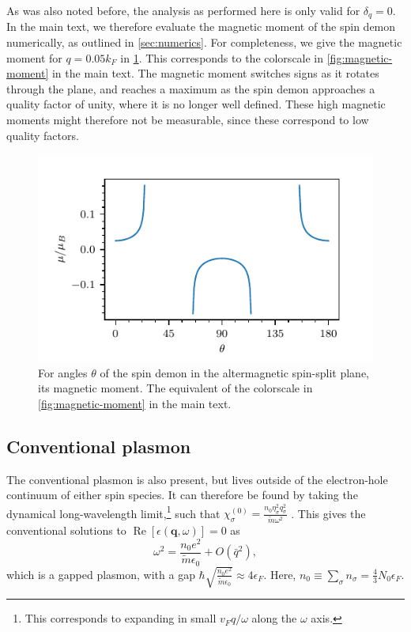 \documentclass[aps,prb,reprint,twocolumns,superscriptaddress,nofootinbib]{revtex4-2}
\DeclareMathOperator{\Ree}{Re}
\newcommand{\mdos}{\tilde{m}}
\newcommand{\kF}{k_{F}}
\begin{document}
	As was also noted before, the analysis as performed here is only valid for $\delta_q=0$.
	In the main text, we therefore evaluate the magnetic moment of the spin demon numerically, as outlined in \cref{sec:numerics}. For completeness, we give the magnetic moment for $q=0.05\kF$ in \cref{fig:magnetic-moment-SM}. This corresponds to the colorscale in \cref{fig:magnetic-moment} in the main text. The magnetic moment switches signs as it rotates through the plane, and reaches a maximum as the spin demon approaches a quality factor of unity, where it is no longer well defined. These high magnetic moments might therefore not be measurable, since these correspond to low quality factors. 
	
	\begin{figure}
		\includegraphics{non-polar-plot-sign}
		\caption{For angles $\theta$ of the spin demon in the altermagnetic spin-split plane, its magnetic moment. The equivalent of the colorscale in \cref{fig:magnetic-moment} in the main text. \label{fig:magnetic-moment-SM}}
	\end{figure}
	
	
	\subsection{Conventional plasmon}
	The conventional plasmon is also present, but lives outside of the electron-hole continuum of either spin species. It can therefore be found by taking the dynamical long-wavelength limit,\footnote{This corresponds to expanding in small $v_Fq/\omega$ along the $\omega$ axis. } such that $\chi_{\sigma}^{(0)}=\frac{n_0 \eta_\sigma^2 q_\sigma^2}{\mdos \omega^2}$ \cite{giulianiQuantumTheoryElectron2005}. This gives the conventional solutions to $\Ree[\epsilon(\bm q,\omega)]=0$ as 
	\begin{equation}
		\omega^2 = \frac{n_0 e^2}{\mdos\epsilon_0} + O(\bar q^2),
	\end{equation}
	which is a gapped plasmon, with a gap $\hbar\sqrt{\frac{n_0 e^2}{\mdos\epsilon_0}}\approx 4\epsilon_F$. Here, $n_0\equiv\sum_\sigma n_\sigma=\frac{4}{3}N_0\epsilon_F$. 
	
\end{document}
